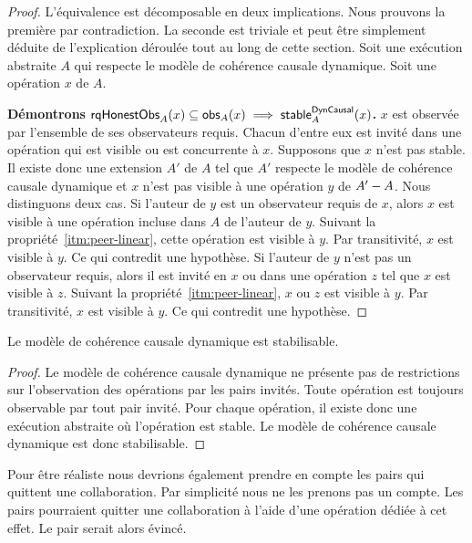 \begin{proof}
L'équivalence est décomposable en deux implications.
Nous prouvons la première par contradiction.
La seconde est triviale et peut être simplement déduite de l'explication déroulée tout au long de cette section.
Soit une exécution abstraite $A$ qui respecte le modèle de cohérence causale dynamique.
Soit une opération $x$ de $A$.

\textbf{Démontrons $\operatorname{\mathsf{rqHonestObs}}_A(x) \subseteq \operatorname{\mathsf{obs}}_A(x) \implies \operatorname{\mathsf{stable}}_A^{\operatorname{\mathsf{DynCausal}}}(x)$.}
$x$ est observée par l'ensemble de ses observateurs requis.
Chacun d'entre eux est invité dans une opération qui est visible ou est concurrente à $x$.
Supposons que $x$ n'est pas stable.
Il existe donc une extension $A'$ de $A$ tel que $A'$ respecte le modèle de cohérence causale dynamique et $x$ n'est pas visible à une opération $y$ de $A' - A$.
Nous distinguons deux cas.
Si l'auteur de $y$ est un observateur requis de $x$, alors $x$ est visible à une opération incluse dans $A$ de l'auteur de $y$.
Suivant la propriété~\ref{itm:peer-linear}, cette opération est visible à $y$.
Par transitivité, $x$ est visible à $y$.
Ce qui contredit une hypothèse.
Si l'auteur de $y$ n'est pas un observateur requis, alors il est invité en $x$ ou dans une opération $z$ tel que $x$ est visible à $z$.
Suivant la propriété~\ref{itm:peer-linear}, $x$ ou $z$ est visible à $y$.
Par transitivité, $x$ est visible à $y$.
Ce qui contredit une hypothèse.
\end{proof}


\begin{theorem}\label{th:stabilizable-dyn-causal}
Le modèle de cohérence causale dynamique est stabilisable.
\end{theorem}

\begin{proof}
Le modèle de cohérence causale dynamique ne présente pas de restrictions sur l'observation des opérations par les pairs invités.
Toute opération est toujours observable par tout pair invité.
Pour chaque opération, il existe donc une exécution abstraite où l'opération est stable.
Le modèle de cohérence causale dynamique est donc stabilisable.
\end{proof}

Pour être réaliste nous devrions également prendre en compte les pairs qui quittent une collaboration.
Par simplicité nous ne les prenons pas un compte.
Les pairs pourraient quitter une collaboration à l'aide d'une opération dédiée à cet effet.
Le pair serait alors évincé.


